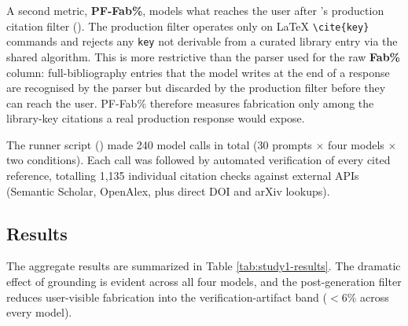 A second metric, \textbf{PF-Fab\%}, models what reaches the user after \sh{}'s production citation filter (). The production filter operates only on LaTeX \texttt{\textbackslash cite\{key\}} commands and rejects any \texttt{key} not derivable from a curated library entry via the shared  algorithm. This is more restrictive than the parser used for the raw \textbf{Fab\%} column: full-bibliography entries that the model writes at the end of a response are recognised by the parser but discarded by the production filter before they can reach the user. PF-Fab\% therefore measures fabrication only among the library-key citations a real production response would expose.

The runner script () made 240 model calls in total (30 prompts $\times$ four models $\times$ two conditions). Each call was followed by automated verification of every cited reference, totalling 1{,}135 individual citation checks against external APIs (Semantic Scholar, OpenAlex, plus direct DOI and arXiv lookups).

\subsection{Results}

The aggregate results are summarized in Table \ref{tab:study1-results}. The dramatic effect of grounding is evident across all four models, and the post-generation filter reduces user-visible fabrication into the verification-artifact band ($<6\%$ across every model).


